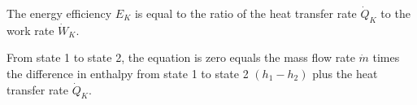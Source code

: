 The energy efficiency \( E_K \) is equal to the ratio of the heat transfer rate \( \dot{Q}_K \) to the work rate \( \dot{W}_K \).

From state 1 to state 2, the equation is zero equals the mass flow rate \( \dot{m} \) times the difference in enthalpy from state 1 to state 2 \( (h_1 - h_2) \) plus the heat transfer rate \( \dot{Q}_K \).